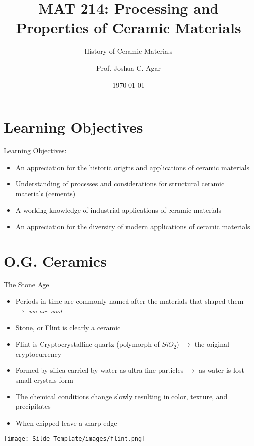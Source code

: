 \documentclass{libs/XJTLU_format}
\title[MAT 214 Spring 2022]{\textbf{MAT 214: Processing and Properties of Ceramic Materials}}
\subtitle{History of Ceramic Materials}
\author{Prof. Joshua C. Agar}
\institute[Lehigh University]{
    \normalsize{\email{jca318@lehigh.edu}}
    \newline
    \department{Materials Science and Engineering}
    \newline
    \university{Lehigh Univeristy}
}
\date{\today}
\begin{document}


\begin{frame}{}
    \maketitle
\end{frame}

\section{Learning Objectives}

\begin{frame}{Learning Objectives:}
\begin{itemize}
    \item An appreciation for the historic origins and applications of ceramic materials
    \item Understanding of processes and considerations for structural ceramic materials (cements)
    \item A working knowledge of industrial applications of ceramic materials
    \item An appreciation for the diversity of modern applications of ceramic materials
\end{itemize}
\end{frame}


\section{O.G. Ceramics}
\begin{frame}{The Stone Age}
\begin{itemize}
    \item Periods in time are commonly named after the materials that shaped them \pause $\rightarrow$ \emph{we are cool} \pause
    \item Stone, or Flint is clearly a ceramic \pause 
    \item Flint is Cryptocrystalline quartz (polymorph of $SiO_2$) $\rightarrow$ the original cryptocurrency \pause
    \item Formed by silica carried by water as ultra-fine particles $\rightarrow$ as water is lost small crystals form \pause
    \item The chemical conditions change slowly resulting in color, texture, and precipitates \pause
    \item When chipped leave a sharp edge
\end{itemize}

\centering
\texttt{[image: Silde\_Template/images/flint.png]}
    
\end{frame}
\end{document}
